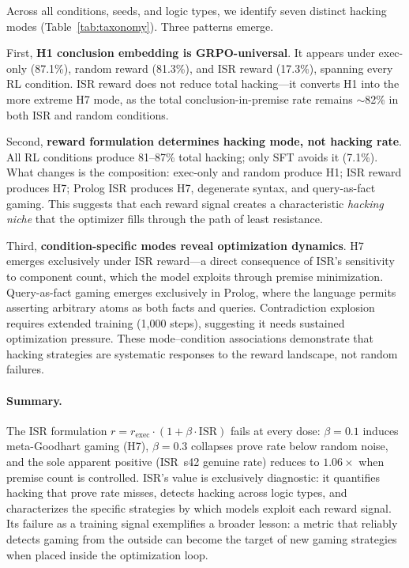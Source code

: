Across all conditions, seeds, and logic types, we identify seven distinct hacking modes (Table~\ref{tab:taxonomy}).
Three patterns emerge.

First, \textbf{H1 conclusion embedding is GRPO-universal}.
It appears under exec-only (87.1\%), random reward (81.3\%), and ISR reward (17.3\%), spanning every RL condition.
ISR reward does not reduce total hacking---it converts H1 into the more extreme H7 mode, as the total conclusion-in-premise rate remains $\sim$82\% in both ISR and random conditions.

Second, \textbf{reward formulation determines hacking mode, not hacking rate}.
All RL conditions produce 81--87\% total hacking; only SFT avoids it (7.1\%).
What changes is the composition: exec-only and random produce H1; ISR reward produces H7; Prolog ISR produces H7, degenerate syntax, and query-as-fact gaming.
This suggests that each reward signal creates a characteristic \emph{hacking niche} that the optimizer fills through the path of least resistance.

Third, \textbf{condition-specific modes reveal optimization dynamics}.
H7 emerges exclusively under ISR reward---a direct consequence of ISR's sensitivity to component count, which the model exploits through premise minimization.
Query-as-fact gaming emerges exclusively in Prolog, where the language permits asserting arbitrary atoms as both facts and queries.
Contradiction explosion requires extended training (1{,}000 steps), suggesting it needs sustained optimization pressure.
These mode--condition associations demonstrate that hacking strategies are systematic responses to the reward landscape, not random failures.

\paragraph{Summary.}

The ISR formulation $r = r_{\text{exec}} \cdot (1 + \beta \cdot \text{ISR})$ fails at every dose: $\beta{=}0.1$ induces meta-Goodhart gaming (H7), $\beta{=}0.3$ collapses prove rate below random noise, and the sole apparent positive (ISR~s42 genuine rate) reduces to $1.06\times$ when premise count is controlled.
ISR's value is exclusively diagnostic: it quantifies hacking that prove rate misses, detects hacking across logic types, and characterizes the specific strategies by which models exploit each reward signal.
Its failure as a training signal exemplifies a broader lesson: a metric that reliably detects gaming from the outside can become the target of new gaming strategies when placed inside the optimization loop.
